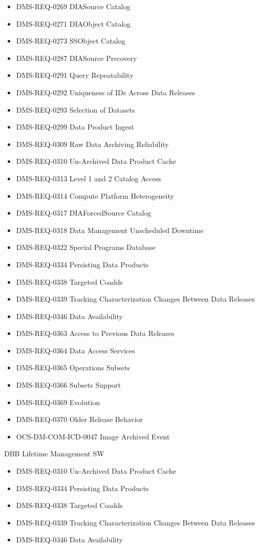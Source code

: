 \begin{itemize}
\item DMS-REQ-0269 DIASource Catalog
\item DMS-REQ-0271 DIAObject Catalog
\item DMS-REQ-0273 SSObject Catalog
\item DMS-REQ-0287 DIASource Precovery
\item DMS-REQ-0291 Query Repeatability
\item DMS-REQ-0292 Uniqueness of IDs Across Data Releases
\item DMS-REQ-0293 Selection of Datasets
\item DMS-REQ-0299 Data Product Ingest
\item DMS-REQ-0309 Raw Data Archiving Reliability
\item DMS-REQ-0310 Un-Archived Data Product Cache
\item DMS-REQ-0313 Level 1 and 2 Catalog Access
\item DMS-REQ-0314 Compute Platform Heterogeneity
\item DMS-REQ-0317 DIAForcedSource Catalog
\item DMS-REQ-0318 Data Management Unscheduled Downtime
\item DMS-REQ-0322 Special Programs Database
\item DMS-REQ-0334 Persisting Data Products
\item DMS-REQ-0338 Targeted Coadds
\item DMS-REQ-0339 Tracking Characterization Changes Between Data Releases
\item DMS-REQ-0346 Data Availability
\item DMS-REQ-0363 Access to Previous Data Releases
\item DMS-REQ-0364 Data Access Services
\item DMS-REQ-0365 Operations Subsets
\item DMS-REQ-0366 Subsets Support
\item DMS-REQ-0369 Evolution
\item DMS-REQ-0370 Older Release Behavior
\item OCS-DM-COM-ICD-0047 Image Archived Event
\end{itemize}
DBB Lifetime Management SW \begin{itemize}
\item DMS-REQ-0310 Un-Archived Data Product Cache
\item DMS-REQ-0334 Persisting Data Products
\item DMS-REQ-0338 Targeted Coadds
\item DMS-REQ-0339 Tracking Characterization Changes Between Data Releases
\item DMS-REQ-0346 Data Availability
\end{itemize}

